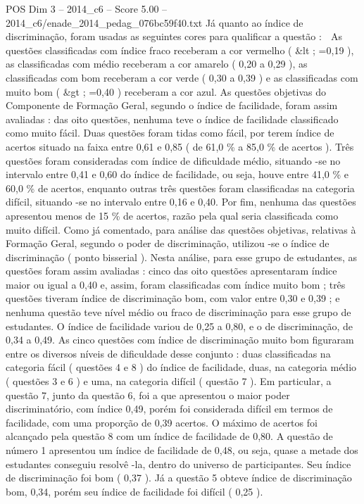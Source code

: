 \begin{textsample}{POS Dim 3 – 2014\_c6 – Score 5.00 – 2014\_c6/enade\_2014\_pedag\_076bc59f40.txt}
Já quanto ao índice de discriminação, foram usadas as seguintes cores para qualificar a questão :  As questões classificadas com índice fraco receberam a cor vermelho ( \&lt ; =0,19 ), as classificadas com médio receberam a cor amarelo ( 0,20 a 0,29 ), as classificadas com bom receberam a cor verde ( 0,30 a 0,39 ) e as classificadas com muito bom ( \&gt ; =0,40 ) receberam a cor azul.
As questões objetivas do Componente de Formação Geral, segundo o índice de facilidade, foram assim avaliadas : das oito questões, nenhuma teve o índice de facilidade classificado como muito fácil.
Duas questões foram tidas como fácil, por terem índice de acertos situado na faixa entre 0,61 e 0,85 ( de 61,0 \% a 85,0 \% de acertos ).
Três questões foram consideradas com índice de dificuldade médio, situando -se no intervalo entre 0,41 e 0,60 do índice de facilidade, ou seja, houve entre 41,0 \% e 60,0 \% de acertos, enquanto outras três questões foram classificadas na categoria difícil, situando -se no intervalo entre 0,16 e 0,40.
Por fim, nenhuma das questões apresentou menos de 15 \% de acertos, razão pela qual seria classificada como muito difícil.
Como já comentado, para análise das questões objetivas, relativas à Formação Geral, segundo o poder de discriminação, utilizou -se o índice de discriminação ( ponto bisserial ).
Nesta análise, para esse grupo de estudantes, as questões foram assim avaliadas : cinco das oito questões apresentaram índice maior ou igual a 0,40 e, assim, foram classificadas com índice muito bom ; três questões tiveram índice de discriminação bom, com valor entre 0,30 e 0,39 ; e nenhuma questão teve nível médio ou fraco de discriminação para esse grupo de estudantes.
O índice de facilidade variou de 0,25 a 0,80, e o de discriminação, de 0,34 a 0,49.
As cinco questões com índice de discriminação muito bom figuraram entre os diversos níveis de dificuldade desse conjunto : duas classificadas na categoria fácil ( questões 4 e 8 ) do índice de facilidade, duas, na categoria médio ( questões 3 e 6 ) e uma, na categoria difícil ( questão 7 ).
Em particular, a questão 7, junto da questão 6, foi a que apresentou o maior poder discriminatório, com índice 0,49, porém foi considerada difícil em termos de facilidade, com uma proporção de 0,39 acertos.
O máximo de acertos foi alcançado pela questão 8 com um índice de facilidade de 0,80.
A questão de número 1 apresentou um índice de facilidade de 0,48, ou seja, quase a metade dos estudantes conseguiu resolvê -la, dentro do universo de participantes.
Seu índice de discriminação foi bom ( 0,37 ).
Já a questão 5 obteve índice de discriminação bom, 0,34, porém seu índice de facilidade foi difícil ( 0,25 ).

\end{textsample}
